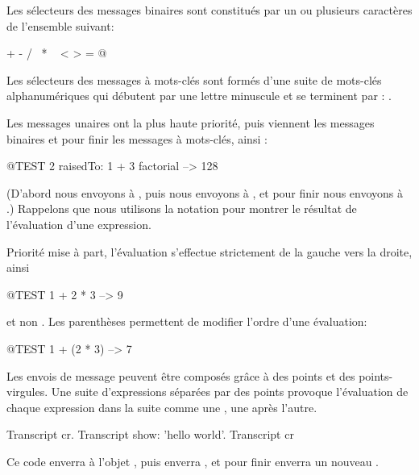 \documentclass[a4paper,10pt,twoside]{book}
\begin{document}
Les s\'{e}lecteurs des messages binaires sont constitu\'{e}s par un ou plusieurs caract\`{e}res de l'ensemble suivant:
\begin{code}{}
+ - / \ * ~ < > = @ %
\end{code}
\noindent

Les s\'{e}lecteurs des messages \`{a} mots-cl\'{e}s sont form\'{e}s d'une suite de mots-cl\'{e}s alphanum\'{e}riques qui d\'{e}butent par une lettre minuscule et se terminent par : .

Les messages unaires ont la plus haute priorit\'{e}, puis viennent les messages binaires et pour finir les messages \`{a} mots-cl\'{e}s, ainsi :
\begin{code}{@TEST}
2 raisedTo: 1 + 3 factorial --> 128
\end{code}
(D'abord nous envoyons  \`{a} , puis nous envoyons  \`{a} , et pour finir nous envoyons  \`{a} .)  
Rappelons que nous utilisons la notation \ct{-->} pour montrer le r\'{e}sultat de l'\'{e}valuation d'une expression. 

Priorit\'{e} mise \`{a} part, l'\'{e}valuation s'effectue strictement de la gauche vers la droite, ainsi 
\begin{code}{@TEST}
1 + 2 * 3 --> 9
\end{code}
et non .
Les parenth\`{e}ses permettent de modifier l'ordre d'une \'{e}valuation:
\begin{code}{@TEST}
1 + (2 * 3) --> 7
\end{code}
Les envois de message peuvent \^{e}tre compos\'{e}s gr\^{a}ce \`{a} des points et des points-virgules. Une suite d'expressions s\'{e}par\'{e}es par des points provoque  l'\'{e}valuation de chaque expression dans la suite comme une , une apr\`{e}s l'autre. 

\begin{code}{}
Transcript cr.
Transcript show: 'hello world'.
Transcript cr
\end{code}

\noindent
Ce code enverra  \`{a} l'objet  , puis enverra  , et pour finir enverra un nouveau .
\end{document}
